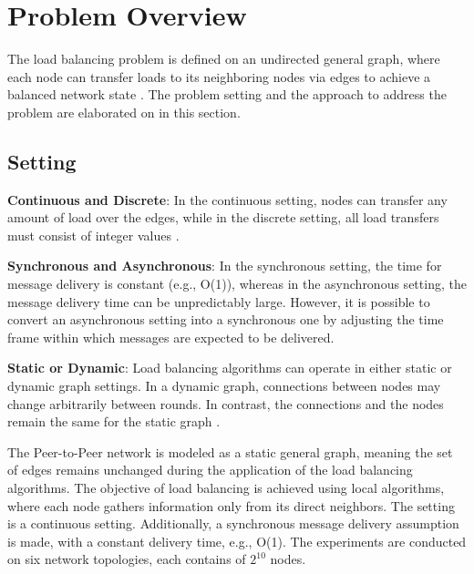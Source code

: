 \chapter{Problem Overview}\label{chap:problemoverview}
The load balancing problem is defined on an undirected general graph, where each node can transfer loads to its neighboring nodes via edges to achieve a balanced network state \cite{Dinitz2023DAB}. The problem setting and the approach to address the problem are elaborated on in this section.

\section{Setting}\label{sec:setting}
\textbf{Continuous and Discrete}: In the continuous setting, nodes can transfer any amount of load over the edges, while in the discrete setting, all load transfers must consist of integer values \cite{Dinitz2023DAB}.

\textbf{Synchronous and Asynchronous}: In the synchronous setting, the time for message delivery is constant (e.g., O(1)), whereas in the asynchronous setting, the message delivery time can be unpredictably large. However, it is possible to convert an asynchronous setting into a synchronous one by adjusting the time frame within which messages are expected to be delivered. \cite{Dinitz2023DAB}

\textbf{Static or Dynamic}: Load balancing algorithms can operate in either static or dynamic graph settings. In a dynamic graph, connections between nodes may change arbitrarily between rounds. In contrast, the connections and the nodes remain the same for the static graph \cite{Dinitz2023DAB}.

The Peer-to-Peer network is modeled as a static general graph, meaning the set of edges remains unchanged during the application of the load balancing algorithms. The objective of load balancing is achieved using local algorithms, where each node gathers information only from its direct neighbors. The setting is a continuous setting. Additionally, a synchronous message delivery assumption is made, with a constant delivery time, e.g., O(1). The experiments are conducted on six network topologies, each contains of $2^{10}$ nodes.

